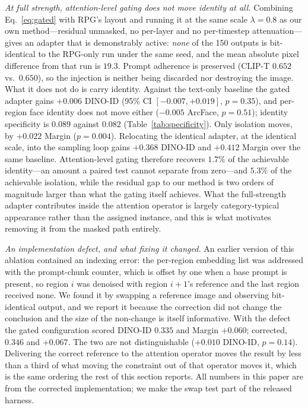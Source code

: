 \documentclass[10pt,twocolumn,letterpaper]{article}
\begin{document}
\noindent\textit{At full strength, attention-level gating does not move
identity at all.}
Combining Eq.~\ref{eq:gated} with RPG's layout and running it at the same
scale $\lambda{=}0.8$ as our own method---residual unmasked, no per-layer
and no per-timestep attenuation---gives an adapter that is demonstrably
active: \emph{none} of the 150 outputs is bit-identical to the RPG-only
run under the same seed, and the mean absolute pixel difference from that
run is $19.3$.  Prompt adherence is preserved (CLIP-T $0.652$ vs.\ $0.650$),
so the injection is neither being discarded nor destroying the image.
What it does not do is carry identity.  Against the text-only baseline the
gated adapter gains $+0.006$ DINO-ID (95\% CI $[-0.007,+0.019]$,
$p{=}0.35$), and per-region face identity does not move either
($-0.005$ ArcFace, $p{=}0.51$); identity specificity is
$0.089$ against $0.082$ (Table~\ref{tab:specificity}).  Only isolation moves,
by $+0.022$ Margin ($p{=}0.004$).  Relocating the identical adapter, at the
identical scale, into the sampling loop gains $+0.368$ DINO-ID and $+0.412$
Margin over the same baseline.  Attention-level gating therefore recovers
$1.7\%$ of the achievable identity---an amount a paired test cannot separate
from zero---and $5.3\%$ of the achievable isolation, while the residual gap
to our method is two orders of magnitude larger than what the gating itself
achieves.
What the
full-strength adapter contributes inside the attention operator is largely
category-typical appearance rather than the assigned instance, and this
is what motivates removing it from the masked path entirely.

\noindent\textit{An implementation defect, and what fixing it changed.}
An earlier version of this ablation contained an indexing error: the
per-region embedding list was addressed with the prompt-chunk counter, which
is offset by one when a base prompt is present, so region $i$ was denoised
with region $i{+}1$'s reference and the last region received none.  We found
it by swapping a reference image and observing bit-identical output, and we
report it because the correction did not change the conclusion and the size
of the non-change is itself informative.  With the defect the gated
configuration scored DINO-ID $0.335$ and Margin $+0.060$; corrected, $0.346$
and $+0.067$.  The two are not distinguishable ($+0.010$ DINO-ID,
$p{=}0.14$).  Delivering the correct reference to the attention operator
moves the result by less than a third of what moving the constraint out of
that operator moves it, which is the same ordering the rest of this section
reports.  All numbers in this paper are from the corrected implementation;
we make the swap test part of the released harness.
\end{document}
